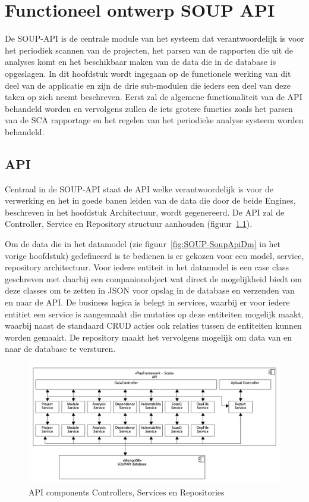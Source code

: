 
\chapter{Functioneel ontwerp SOUP API}\label{ch:impl soup api}
De SOUP-API is de centrale module van het systeem dat verantwoordelijk is voor het periodiek scannen van de projecten, het parsen van de rapporten die uit de analyses komt en het beschikbaar maken van de data die in de database is opgeslagen. In dit hoofdstuk wordt  ingegaan op de functionele werking van dit deel van de applicatie en zijn de drie sub-modulen die ieders een deel van deze taken op zich neemt beschreven. Eerst zal de algemene functionaliteit van de API behandeld worden en vervolgens zullen de iets grotere functies zoals het parsen van de SCA rapportage en het regelen van het periodieke analyse systeem worden behandeld.


\section{API}\label{sec:api2}
Centraal in de SOUP-API staat de API welke verantwoordelijk is voor de verwerking en het in goede banen leiden van de data die door de beide Engines, beschreven in het hoofdstuk Architectuur, wordt gegenereerd. De API zal de Controller, Service en Repository structuur aanhouden (figuur~\ref{fig:API components}).

Om de data die in het datamodel (zie figuur~\ref{fig:SOUP-SoupApiDm} in het vorige hoofdstuk) gedefineerd is te bedienen is er gekozen voor een model, service, repository architectuur. Voor iedere entiteit in het datamodel is een case class geschreven met daarbij een companionobject wat direct de mogelijkheid biedt om deze classes om te zetten in JSON voor opslag in de database en verzenden van en naar de API. De business logica is belegt in services, waarbij er voor iedere entitiet een service is aangemaakt die mutaties op deze entiteiten mogelijk maakt, waarbij naast de standaard CRUD acties ook relaties tussen de entiteiten kunnen worden gemaakt. De repository maakt het vervolgens mogelijk om data van en naar de database te versturen.

\begin{figure}[bth]
    \myfloatalign
    \includegraphics[width=12cm]{gfx/umlet/exports/API-ComponentsDiagram}
    \caption{API components Controllers, Services en Repositories}
    \label{fig:API components}
\end{figure}


